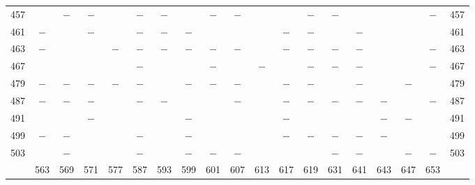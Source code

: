 \begin{center}
\begin{tabular}{r|c|c|c|c|c|c|c|c|c|c|c|c|c|c|c|c|c|r}
457 &  & $-$ & $-$ &  & $-$ & $-$ &  & $-$ & $-$ &  &  & $-$ & $-$ &  &  &  & $-$ & 457\\
461 & $-$ &  & $-$ &  & $-$ & $-$ & $-$ &  &  &  & $-$ & $-$ &  & $-$ &  &  &  & 461\\
463 & $-$ &  &  & $-$ & $-$ & $-$ & $-$ & $-$ & $-$ &  & $-$ & $-$ & $-$ & $-$ &  &  & $-$ & 463\\
467 &  &  &  &  & $-$ &  &  & $-$ &  & $-$ &  & $-$ & $-$ & $-$ &  &  & $-$ & 467\\
479 & $-$ & $-$ & $-$ & $-$ & $-$ &  & $-$ & $-$ & $-$ &  & $-$ & $-$ &  & $-$ &  & $-$ &  & 479\\
487 & $-$ & $-$ & $-$ &  & $-$ & $-$ &  &  & $-$ &  & $-$ & $-$ & $-$ & $-$ & $-$ &  & $-$ & 487\\
491 &  &  & $-$ &  &  &  & $-$ &  &  &  & $-$ &  &  &  & $-$ & $-$ &  & 491\\
499 & $-$ & $-$ &  &  & $-$ &  & $-$ &  &  &  & $-$ & $-$ & $-$ & $-$ & $-$ &  &  & 499\\
503 &  & $-$ &  &  & $-$ &  & $-$ & $-$ & $-$ &  &  &  & $-$ & $-$ &  & $-$ & $-$ & 503\\
\hline
 & 563 & 569 & 571 & 577 & 587 & 593 & 599 & 601 & 607 & 613 & 617 & 619 & 631 & 641 & 643 & 647 & 653 & \\
\hline
\end{tabular}\endgroup\end{center}
\clearpage
